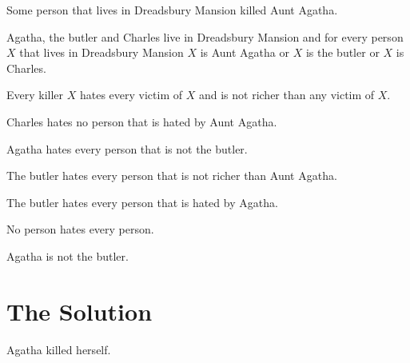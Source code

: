 \documentclass{article}
\begin{document}
\begin{forthel}
  \begin{axiom}
    Some person that lives in Dreadsbury Mansion killed Aunt Agatha.
  \end{axiom}
  \begin{axiom}
    Agatha, the butler and Charles live in Dreadsbury Mansion and for every person $X$ that lives in Dreadsbury Mansion $X$ is Aunt Agatha or $X$ is the butler or $X$ is Charles.
  \end{axiom}
  \begin{axiom}
    Every killer $X$ hates every victim of $X$ and is not richer than any victim of $X$.
  \end{axiom}
  \begin{axiom}
    Charles hates no person that is hated by Aunt Agatha.
  \end{axiom}
  \begin{axiom}
    Agatha hates every person that is not the butler.
  \end{axiom}
  \begin{axiom}
    The butler hates every person that is not richer than Aunt Agatha.
  \end{axiom}
  \begin{axiom}
    The butler hates every person that is hated by Agatha.
  \end{axiom}
  \begin{axiom}
    No person hates every person.
  \end{axiom}
  \begin{axiom}
    Agatha is not the butler.
  \end{axiom}
\end{forthel}


\section{The Solution}

\begin{forthel}
  \begin{theorem}
    Agatha killed herself.
  \end{theorem}
\end{forthel}

\printbibliography
\end{document}
